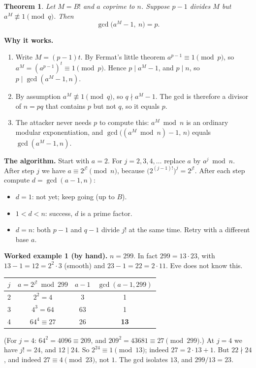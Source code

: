 \documentclass[11pt]{article}
\newtheorem{theorem}{Theorem}
\begin{document}
\begin{theorem}
Let $M=B!$ and $a$ coprime to $n$. Suppose $p-1$ divides $M$ but $a^M\not\equiv1\pmod q$. Then
\[
\gcd\bigl(a^M-1,\ n\bigr)=p.
\]
\end{theorem}

\textbf{Why it works.}
\begin{enumerate}[nosep]
\item Write $M=(p-1)t$. By Fermat's little theorem $a^{p-1}\equiv1\pmod p$, so $a^M=(a^{p-1})^t\equiv1\pmod p$. Hence $p\mid a^M-1$, and $p\mid n$, so $p\mid\gcd(a^M-1,n)$.
\item By assumption $a^M\not\equiv1\pmod q$, so $q\nmid a^M-1$. The gcd is therefore a divisor of $n=pq$ that contains $p$ but not $q$, so it equals $p$.
\item The attacker never needs $p$ to compute this: $a^M\bmod n$ is an ordinary modular exponentiation, and $\gcd\bigl((a^M\bmod n)-1,\,n\bigr)$ equals $\gcd(a^M-1,n)$.
\end{enumerate}

\textbf{The algorithm.} Start with $a=2$. For $j=2,3,4,\dots$ replace $a$ by $a^j\bmod n$. After step $j$ we have $a\equiv2^{j!}\pmod n$, because $\bigl(2^{(j-1)!}\bigr)^j=2^{j!}$. After each step compute $d=\gcd(a-1,n)$:
\begin{itemize}[nosep]
\item $d=1$: not yet; keep going (up to $B$).
\item $1<d<n$: success, $d$ is a prime factor.
\item $d=n$: both $p-1$ and $q-1$ divide $j!$ at the same time. Retry with a different base $a$.
\end{itemize}

\textbf{Worked example 1 (by hand).} $n=299$. In fact $299=13\cdot23$, with $13-1=12=2^2\cdot3$ (smooth) and $23-1=22=2\cdot11$. Eve does not know this.
\begin{center}
\begin{tabular}{@{}cccc@{}}
\toprule
$j$ & $a=2^{j!}\bmod299$ & $a-1$ & $\gcd(a-1,299)$ \\
\midrule
2 & $2^2=4$ & 3 & 1 \\
3 & $4^3=64$ & 63 & 1 \\
4 & $64^4\equiv27$ & 26 & \textbf{13} \\
\bottomrule
\end{tabular}
\end{center}
(For $j=4$: $64^2=4096\equiv209$, and $209^2=43681\equiv27\pmod{299}$.) At $j=4$ we have $j!=24$, and $12\mid24$. So $2^{24}\equiv1\pmod{13}$; indeed $27=2\cdot13+1$. But $22\nmid24$, and indeed $27\equiv4\pmod{23}$, not $1$. The gcd isolates $13$, and $299/13=23$.
\end{document}
